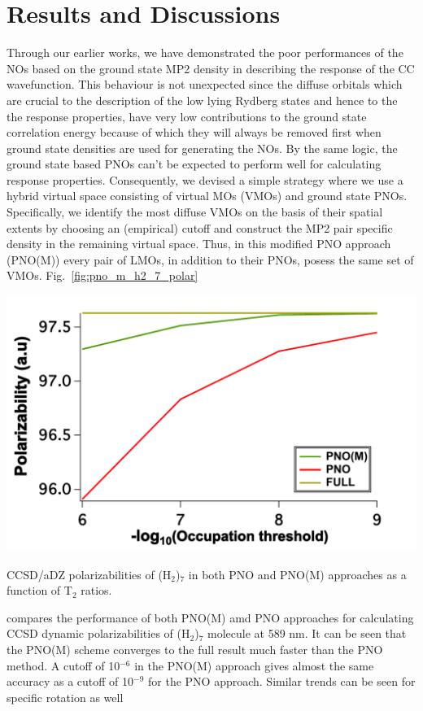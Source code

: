 \section{Results and Discussions}
Through our earlier works\cite{Kumar17,Kumar18:1}, we have demonstrated the poor performances of 
the NOs based on the ground state MP2 density in describing the response 
of the CC wavefunction. This behaviour is not unexpected since the diffuse orbitals
which are crucial to the description of the low lying Rydberg states and hence to the  
the response properties, have very low contributions to the ground state correlation energy
because of which they will always be removed first when ground state densities are used
for generating the NOs. By the same logic, the ground state based PNOs can't be expected to 
perform well for calculating response properties. Consequently, we devised a simple strategy 
where we use a hybrid virtual space consisting of virtual MOs (VMOs) and ground state PNOs. 
Specifically, we identify the most diffuse VMOs on the basis of their spatial extents\cite{Kumar18:1} 
by choosing an (empirical) cutoff and construct the MP2 pair specific density in the remaining  
virtual space. Thus, in this modified PNO approach (PNO(M)) every pair of LMOs, in addition to 
their PNOs, posess the same set of VMOs. 
Fig.~\ref{fig:pno_m_h2_7_polar}
\begin{MyFigure}[h!]
\centering
\includegraphics[width=0.6\linewidth,natwidth=610,natheight=642]{figures_pno++/pno_m_h2_7_adz_polar.pdf}
\caption{{\footnotesize CCSD/aDZ polarizabilities of (H$_2$)$_7$ in both PNO and PNO(M) approaches 
as a function of T$_2$ ratios.}}
\label{fig:pno_m_h2_7_polar}
\end{MyFigure}
compares the performance of both PNO(M) amd PNO approaches for calculating CCSD dynamic polarizabilities of
(H$_2$)$_7$ molecule at 589 nm. It can be seen that the PNO(M) scheme converges to the full result much 
faster than the PNO method. A cutoff of 10$^{-6}$ in the PNO(M) approach gives almost the same accuracy as 
a cutoff of 10$^{-9}$ for the PNO approach. Similar trends can be seen for specific rotation as well
